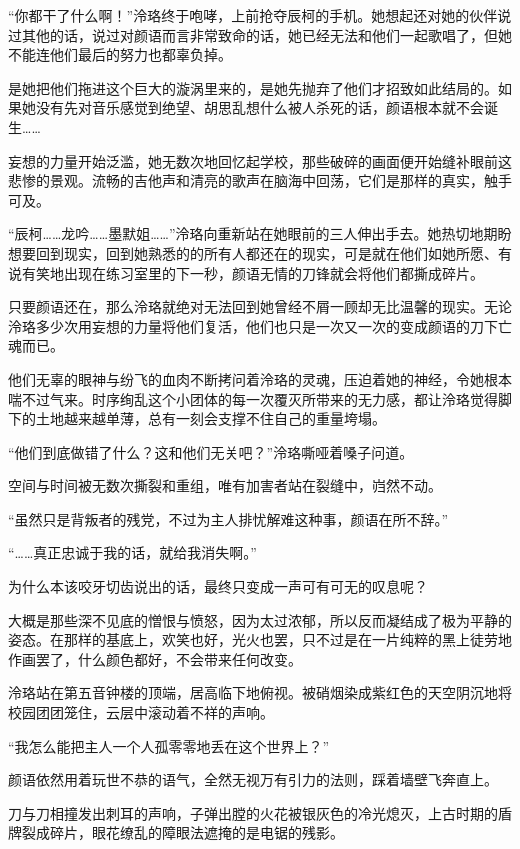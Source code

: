 \documentclass[UTF8, scheme = chinese, openany]{ctexbook}
\begin{document}
“你都干了什么啊！”泠珞终于咆哮，上前抢夺辰柯的手机。她想起还对她的伙伴说过其他的话，说过对颜语而言非常致命的话，她已经无法和他们一起歌唱了，但她不能连他们最后的努力也都辜负掉。

是她把他们拖进这个巨大的漩涡里来的，是她先抛弃了他们才招致如此结局的。如果她没有先对音乐感觉到绝望、胡思乱想什么被人杀死的话，颜语根本就不会诞生……

妄想的力量开始泛滥，她无数次地回忆起学校，那些破碎的画面便开始缝补眼前这悲惨的景观。流畅的吉他声和清亮的歌声在脑海中回荡，它们是那样的真实，触手可及。

“辰柯……龙吟……墨默姐……”泠珞向重新站在她眼前的三人伸出手去。她热切地期盼想要回到现实，回到她熟悉的的所有人都还在的现实，可是就在他们如她所愿、有说有笑地出现在练习室里的下一秒，颜语无情的刀锋就会将他们都撕成碎片。

只要颜语还在，那么泠珞就绝对无法回到她曾经不屑一顾却无比温馨的现实。无论泠珞多少次用妄想的力量将他们复活，他们也只是一次又一次的变成颜语的刀下亡魂而已。

他们无辜的眼神与纷飞的血肉不断拷问着泠珞的灵魂，压迫着她的神经，令她根本喘不过气来。时序绚乱这个小团体的每一次覆灭所带来的无力感，都让泠珞觉得脚下的土地越来越单薄，总有一刻会支撑不住自己的重量垮塌。

“他们到底做错了什么？这和他们无关吧？”泠珞嘶哑着嗓子问道。

空间与时间被无数次撕裂和重组，唯有加害者站在裂缝中，岿然不动。

“虽然只是背叛者的残党，不过为主人排忧解难这种事，颜语在所不辞。”

“……真正忠诚于我的话，就给我消失啊。”

\vspace{1.5em}

为什么本该咬牙切齿说出的话，最终只变成一声可有可无的叹息呢？

大概是那些深不见底的憎恨与愤怒，因为太过浓郁，所以反而凝结成了极为平静的姿态。在那样的基底上，欢笑也好，光火也罢，只不过是在一片纯粹的黑上徒劳地作画罢了，什么颜色都好，不会带来任何改变。

泠珞站在第五音钟楼的顶端，居高临下地俯视。被硝烟染成紫红色的天空阴沉地将校园团团笼住，云层中滚动着不祥的声响。

“我怎么能把主人一个人孤零零地丢在这个世界上？”

颜语依然用着玩世不恭的语气，全然无视万有引力的法则，踩着墙壁飞奔直上。

刀与刀相撞发出刺耳的声响，子弹出膛的火花被银灰色的冷光熄灭，上古时期的盾牌裂成碎片，眼花缭乱的障眼法遮掩的是电锯的残影。
\end{document}
